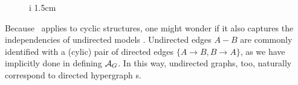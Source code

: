 \begin{wrapfigure}[5]{i}
        {1.5cm}
    \vspace{-1em}
    \centering
\end{wrapfigure}
Because \scibility\ applies to cyclic structures,  one might wonder if
    it also captures the independencies of undirected models 
    \unskip.
Undirected edges $A {-} B$ are commonly identified
with a (cylic) pair of directed edges $\{ A{\to}B, B{\to}A\}$,
as we have implicitly done in
defining $\mathcal A_G$. 
In this way, undirected graphs, too, naturally correspond to directed hypergraph s.
